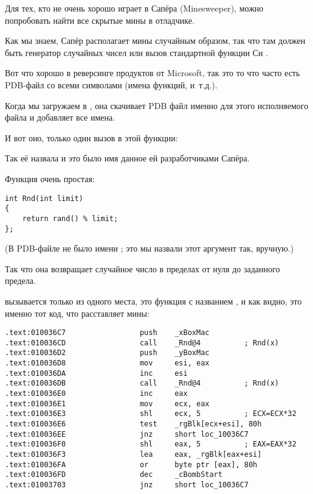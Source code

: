 \mysection{\MinesweeperWinXPExampleChapterName}
\label{minesweeper_winxp}

Для тех, кто не очень хорошо играет в Сапёра (Minesweeper), можно попробовать найти все скрытые мины в отладчике.

Как мы знаем, Сапёр располагает мины случайным образом, так что там должен быть генератор случайных чисел
или вызов стандартной функции Си .

Вот что хорошо в реверсинге продуктов от Microsoft, так это то что часто есть \gls{PDB}-файл со всеми
символами (имена функций, и~т.д.).

Когда мы загружаем  в \IDA, она скачивает 
\gls{PDB} файл именно для этого исполняемого файла и добавляет все имена.

И вот оно, только один вызов  в этой функции:



Так её назвала \IDA и это было имя данное ей разработчиками Сапёра.

Функция очень простая:

\begin{lstlisting}[style=customc]
int Rnd(int limit)
{
    return rand() % limit;
};
\end{lstlisting}

(В \gls{PDB}-файле не было имени ; это мы назвали этот аргумент так, вручную.)

Так что она возвращает случайное число в пределах от нуля до заданного предела.

 вызывается только из одного места, это функция с названием , 
и как видно, это именно тот код, что расставляет мины:

\begin{lstlisting}[style=customasmx86]
.text:010036C7                 push    _xBoxMac
.text:010036CD                 call    _Rnd@4          ; Rnd(x)
.text:010036D2                 push    _yBoxMac
.text:010036D8                 mov     esi, eax
.text:010036DA                 inc     esi
.text:010036DB                 call    _Rnd@4          ; Rnd(x)
.text:010036E0                 inc     eax
.text:010036E1                 mov     ecx, eax
.text:010036E3                 shl     ecx, 5          ; ECX=ECX*32
.text:010036E6                 test    _rgBlk[ecx+esi], 80h
.text:010036EE                 jnz     short loc_10036C7
.text:010036F0                 shl     eax, 5          ; EAX=EAX*32
.text:010036F3                 lea     eax, _rgBlk[eax+esi]
.text:010036FA                 or      byte ptr [eax], 80h
.text:010036FD                 dec     _cBombStart
.text:01003703                 jnz     short loc_10036C7
\end{lstlisting}

